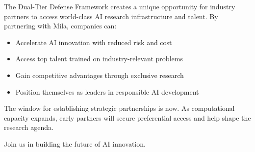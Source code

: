 The Dual-Tier Defense Framework creates a unique opportunity for industry partners to access world-class AI research infrastructure and talent. By partnering with Mila, companies can:

\begin{itemize}
\item Accelerate AI innovation with reduced risk and cost
\item Access top talent trained on industry-relevant problems
\item Gain competitive advantages through exclusive research
\item Position themselves as leaders in responsible AI development
\end{itemize}

The window for establishing strategic partnerships is now. As computational capacity expands, early partners will secure preferential access and help shape the research agenda. 

Join us in building the future of AI innovation.